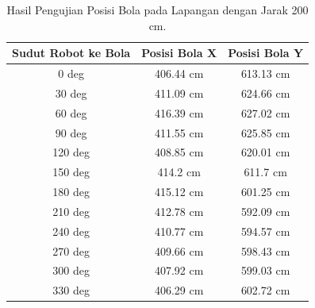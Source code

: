 \begin{table}[htbp]
  \caption{Hasil Pengujian Posisi Bola pada Lapangan dengan Jarak 200 cm.}
  \begin{center}

  \begin{tabular}{|c|c|c|}
  \hline
  \rowcolor[HTML]{C0C0C0}
  \textbf{Sudut Robot ke Bola} & \textbf{Posisi Bola X} & \textbf{Posisi Bola Y} \\
  \hline
  0 deg            & 406.44 cm                & 613.13 cm            \\
  30 deg           & 411.09 cm                & 624.66 cm            \\
  60 deg           & 416.39 cm                & 627.02 cm            \\
  90 deg           & 411.55 cm                & 625.85 cm           \\
  120 deg           & 408.85 cm                & 620.01 cm           \\
  150 deg           & 414.2 cm                & 611.7 cm           \\
  180 deg           & 415.12 cm                & 601.25 cm           \\
  210 deg           & 412.78 cm                & 592.09 cm           \\
  240 deg           & 410.77 cm                & 594.57 cm           \\
  270 deg           & 409.66 cm                & 598.43 cm           \\
  300 deg           & 407.92 cm                & 599.03 cm           \\
  330 deg           & 406.29 cm                & 602.72 cm           \\
  \hline
\end{tabular}
\end{center}
\end{table}

